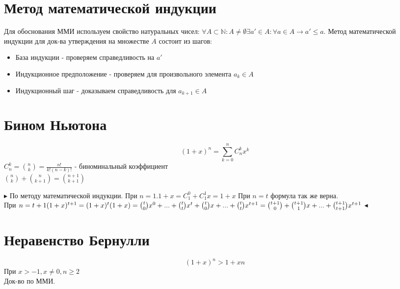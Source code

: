 \documentclass[14pt]{extreport}
\begin{document}
    \section{Метод математической индукции}
        Для обоснования ММИ используем свойство натуральных чисел: $\forall A \subset \mathbb{N}: A \neq \emptyset \exists a' \in A: \forall a \in A \rightarrow a' \leq a$. Метод математической индукции для док-ва утверждения на множестве $A$ состоит из шагов:
        \begin{itemize}
            \item База индукции - проверяем справедливость на $a'$
            \item Индукционное предположение - проверяем для произвольного элемента $a_k \in A$
            \item Индукционный шаг - доказываем справедливость для $a_{k+1} \in A$
        \end{itemize}

    \section{Бином Ньютона}
        \begin{equation}
            (1+x)^n = \sum^n_{k=0} C^k_n x^k
        \end{equation}
        $C^k_n =\binom{n}{k}= \frac{n!}{k!(n-k)!}$ - биноминальный коэффициент\\
        $\binom{n}{k} + \binom{n}{k+1} = \binom{n+1}{k+1}$

        $\blacktriangleright$
            По методу математической индукции. 
            При $n=1. 1+x = C^0_1 + C^1_1 x = 1+x$
            При $n=t$ формула так же верна. \\ 
            При $n=t+1 \\ (1+x)^{t+1} = (1+x)^t(1+x) = \binom{t}{0}x^0 + ... + \binom{t}{t}x^t + \binom{t}{0} x + ... + \binom{t}{t}x^{t+1} = \binom{t+1}{0} + \binom{t+1}{1}x + ... + \binom{t+1}{t+1} x^{t+1}$
        $\blacktriangleleft$

    \section{Неравенство Бернулли}
        \begin{equation}
            (1+x)^n > 1 + xn
        \end{equation}
        При $x>-1, x\neq 0, n \geq 2$ \\ 
        Док-во по ММИ.
\end{document}
